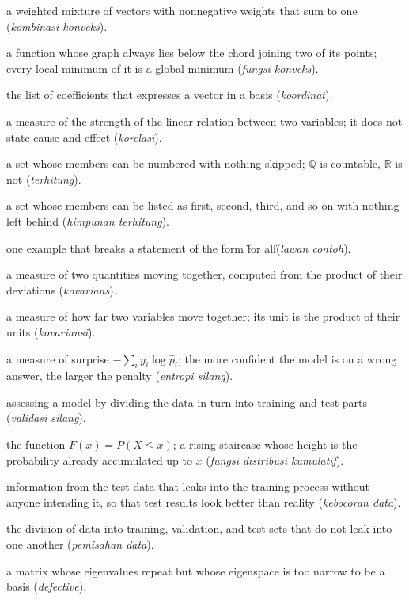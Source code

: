 \begin{description}[style=nextline,itemsep=0.35em]
  \item[Convex combination] a weighted mixture of vectors with nonnegative weights that sum to one (\emph{kombinasi konveks}).
  \item[Convex function] a function whose graph always lies below the chord joining two of its points; every local minimum of it is a global minimum (\emph{fungsi konveks}).
  \item[Coordinate vector] the list of coefficients that expresses a vector in a basis (\emph{koordinat}).
  \item[Correlation] a measure of the strength of the linear relation between two variables; it does not state cause and effect (\emph{korelasi}).
  \item[Countable] a set whose members can be numbered with nothing skipped; $\mathbb{Q}$ is countable, $\mathbb{R}$ is not (\emph{terhitung}).
  \item[Countable set] a set whose members can be listed as first, second, third, and so on with nothing left behind (\emph{himpunan terhitung}).
  \item[Counterexample] one example that breaks a statement of the form \"for all\" (\emph{lawan contoh}).
  \item[Covariance] a measure of two quantities moving together, computed from the product of their deviations (\emph{kovarians}).
  \item[Covariance] a measure of how far two variables move together; its unit is the product of their units (\emph{kovariansi}).
  \item[Cross-entropy] a measure of surprise $-\sum_i y_i\log \hat{p}_i$; the more confident the model is on a wrong answer, the larger the penalty (\emph{entropi silang}).
  \item[Cross-validation] assessing a model by dividing the data in turn into training and test parts (\emph{validasi silang}).
  \item[Cumulative distribution function] the function $F(x)=P(X\le x)$; a rising staircase whose height is the probability already accumulated up to $x$ (\emph{fungsi distribusi kumulatif}).
  \item[Data leakage] information from the test data that leaks into the training process without anyone intending it, so that test results look better than reality (\emph{kebocoran data}).
  \item[Data split] the division of data into training, validation, and test sets that do not leak into one another (\emph{pemisahan data}).
  \item[Defective] a matrix whose eigenvalues repeat but whose eigenspace is too narrow to be a basis (\emph{defective}).

\end{description}
